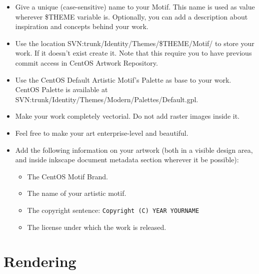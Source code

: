 \documentclass{article}
\begin{document}
\begin{itemize}

\item Give a unique (case-sensitive) name to your Motif. This name is
used as value wherever \$THEME variable is. Optionally, you can add a
description about inspiration and concepts behind your work.

\item Use the location SVN:trunk/Identity/Themes/\$THEME/Motif/ to
store your work. If it doesn't exist create it. Note that this require
you to have previous commit access in CentOS Artwork Repository.

\item Use the CentOS Default Artistic Motif's Palette as base to your
work. CentOS Palette is available at
SVN:trunk/Identity/Themes/Modern/Palettes/Default.gpl.

\item Make your work completely vectorial. Do not add raster images
inside it.

\item Feel free to make your art enterprise-level and beautiful.

\item Add the following information on your artwork (both in a visible
design area, and inside inkscape document metadata section wherever it
be possible):

\begin{itemize}
\item The CentOS Motif Brand.
\item The name of your artistic motif.
\item The copyright sentence: \texttt{Copyright (C) YEAR YOURNAME}
\item The license under which the work is released. 
\end{itemize}
\end{itemize}

\section{Rendering}
\end{document}
